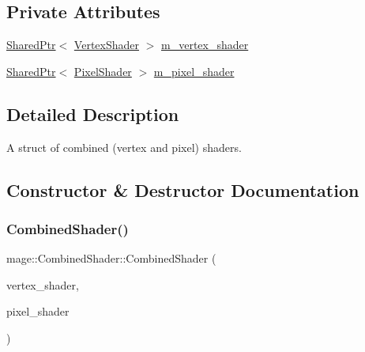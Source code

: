\subsection*{Private Attributes}
\begin{DoxyCompactItemize}
\item 
\hyperlink{namespacemage_a1e01ae66713838a7a67d30e44c67703e}{Shared\+Ptr}$<$ \hyperlink{classmage_1_1_vertex_shader}{Vertex\+Shader} $>$ \hyperlink{structmage_1_1_combined_shader_ae70a1404acc466fc7fbcb05756140f54}{m\+\_\+vertex\+\_\+shader}
\item 
\hyperlink{namespacemage_a1e01ae66713838a7a67d30e44c67703e}{Shared\+Ptr}$<$ \hyperlink{classmage_1_1_pixel_shader}{Pixel\+Shader} $>$ \hyperlink{structmage_1_1_combined_shader_a562b58278dcb98469c98250a636c640e}{m\+\_\+pixel\+\_\+shader}
\end{DoxyCompactItemize}


\subsection{Detailed Description}
A struct of combined (vertex and pixel) shaders. 

\subsection{Constructor \& Destructor Documentation}
\hypertarget{structmage_1_1_combined_shader_ab9d6ce4dc9ed2602b19729ee8d126f61}{}\label{structmage_1_1_combined_shader_ab9d6ce4dc9ed2602b19729ee8d126f61} 
\subsubsection{\texorpdfstring{Combined\+Shader()}{CombinedShader()}\hspace{0.1cm}{\footnotesize\ttfamily [1/3]}}
{\footnotesize\ttfamily mage\+::\+Combined\+Shader\+::\+Combined\+Shader (\begin{DoxyParamCaption}\item[{\hyperlink{namespacemage_a1e01ae66713838a7a67d30e44c67703e}{Shared\+Ptr}$<$ \hyperlink{classmage_1_1_vertex_shader}{Vertex\+Shader} $>$}]{vertex\+\_\+shader,  }\item[{\hyperlink{namespacemage_a1e01ae66713838a7a67d30e44c67703e}{Shared\+Ptr}$<$ \hyperlink{classmage_1_1_pixel_shader}{Pixel\+Shader} $>$}]{pixel\+\_\+shader }\end{DoxyParamCaption})\hspace{0.3cm}{\ttfamily [explicit]}}

